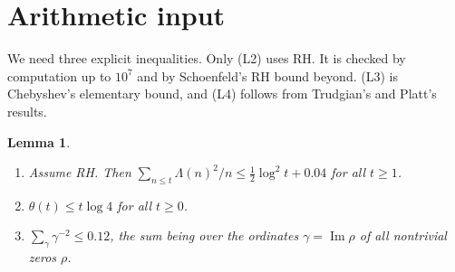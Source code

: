 \documentclass[11pt]{amsart}
\newtheorem{lemma}[theorem]{Lemma}
\theoremstyle{remark}
\begin{document}
\section{Arithmetic input}\label{sec:arith}

We need three explicit inequalities. Only (L2) uses RH. It is checked by computation up to $10^7$ and by Schoenfeld's RH bound beyond. (L3) is Chebyshev's elementary bound, and (L4) follows from Trudgian's and Platt's results.

\begin{lemma}\label{lem:arith}
\begin{enumerate}
\item[(L2)] Assume RH. Then $\sum_{n\le t}\Lambda(n)^2/n\le\frac12\log^2t+0.04$ for all $t\ge1$.
\item[(L3)] $\theta(t)\le t\log4$ for all $t\ge0$.
\item[(L4)] $\sum_\gamma\gamma^{-2}\le0.12$, the sum being over the ordinates $\gamma=\operatorname{Im}\rho$ of all nontrivial zeros $\rho$.
\end{enumerate}
\end{lemma}
\end{document}
